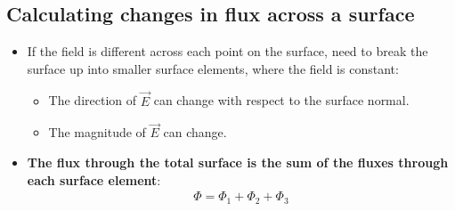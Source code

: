 \documentclass[aspectratio=169,
hyperref={colorlinks,urlcolor=blue}
]{beamer}
\begin{document}
\subsection{Calculating changes in flux across a surface}
\label{subsec:calculatingchangesinfluxacrossasurface}
{
\begin{itemize}
\item If the field is different across each point on the surface, need to break the surface up into smaller surface elements, where the field is constant:
\begin{itemize}
\item The direction of $\vec E$ can change with respect to the surface normal.
\item The magnitude of $\vec E$ can change.
\end{itemize}
\item \textbf{The flux through the total surface is the sum of the fluxes through each surface element}:
\begin{align*}
\Phi=\Phi_1+\Phi_2+\Phi_3
\end{align*}
\end{itemize}
}
\end{document}
